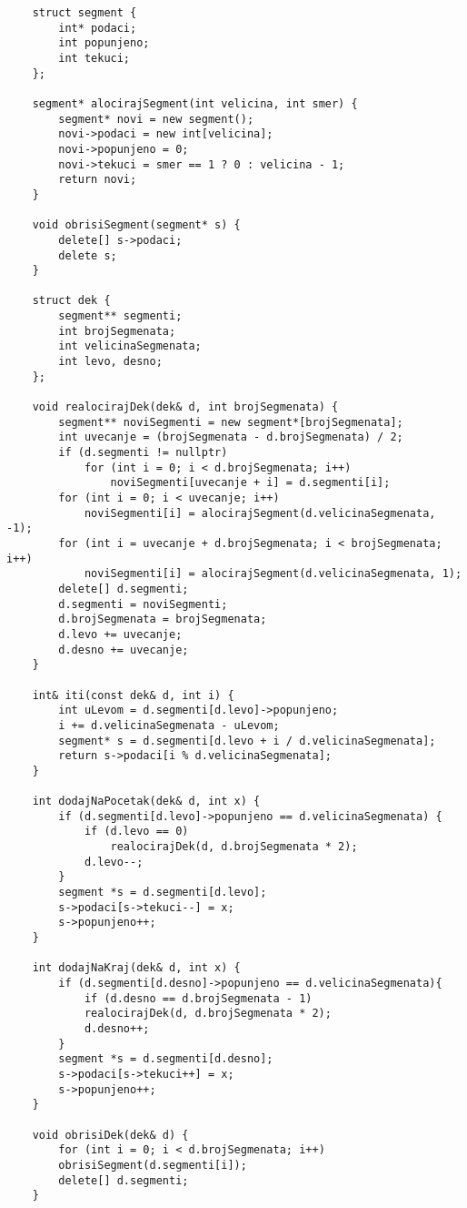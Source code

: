 \documentclass{article}
\begin{document}
\begin{lstlisting}
    struct segment {
        int* podaci;
        int popunjeno;
        int tekuci;
    };
    
    segment* alocirajSegment(int velicina, int smer) {
        segment* novi = new segment();
        novi->podaci = new int[velicina];
        novi->popunjeno = 0;
        novi->tekuci = smer == 1 ? 0 : velicina - 1;
        return novi;
    }
    
    void obrisiSegment(segment* s) {
        delete[] s->podaci;
        delete s;
    }
    
    struct dek {
        segment** segmenti;
        int brojSegmenata;
        int velicinaSegmenata;
        int levo, desno;
    };
    
    void realocirajDek(dek& d, int brojSegmenata) {
        segment** noviSegmenti = new segment*[brojSegmenata];
        int uvecanje = (brojSegmenata - d.brojSegmenata) / 2;
        if (d.segmenti != nullptr)
            for (int i = 0; i < d.brojSegmenata; i++)
                noviSegmenti[uvecanje + i] = d.segmenti[i];
        for (int i = 0; i < uvecanje; i++)
            noviSegmenti[i] = alocirajSegment(d.velicinaSegmenata, -1);
        for (int i = uvecanje + d.brojSegmenata; i < brojSegmenata; i++)
            noviSegmenti[i] = alocirajSegment(d.velicinaSegmenata, 1);
        delete[] d.segmenti;
        d.segmenti = noviSegmenti;
        d.brojSegmenata = brojSegmenata;
        d.levo += uvecanje;
        d.desno += uvecanje;
    }
    
    int& iti(const dek& d, int i) {
        int uLevom = d.segmenti[d.levo]->popunjeno;
        i += d.velicinaSegmenata - uLevom;
        segment* s = d.segmenti[d.levo + i / d.velicinaSegmenata];
        return s->podaci[i % d.velicinaSegmenata];
    }
    
    int dodajNaPocetak(dek& d, int x) {
        if (d.segmenti[d.levo]->popunjeno == d.velicinaSegmenata) {
            if (d.levo == 0)
                realocirajDek(d, d.brojSegmenata * 2);
            d.levo--;
        }
        segment *s = d.segmenti[d.levo];
        s->podaci[s->tekuci--] = x;
        s->popunjeno++;
    }
    
    int dodajNaKraj(dek& d, int x) {
        if (d.segmenti[d.desno]->popunjeno == d.velicinaSegmenata){
            if (d.desno == d.brojSegmenata - 1)
            realocirajDek(d, d.brojSegmenata * 2);
            d.desno++;
        }
        segment *s = d.segmenti[d.desno];
        s->podaci[s->tekuci++] = x;
        s->popunjeno++;
    }
    
    void obrisiDek(dek& d) {
        for (int i = 0; i < d.brojSegmenata; i++)
        obrisiSegment(d.segmenti[i]);
        delete[] d.segmenti;
    }
\end{lstlisting}
\end{document}
